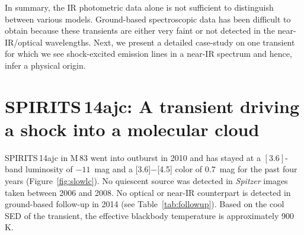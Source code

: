 \documentclass[twocolumn,times]{aastex6}
\begin{document}
%

In summary, the IR photometric data alone is not sufficient to  distinguish between 
various models. Ground-based spectroscopic data has been difficult to obtain because these transients
are either very faint or not detected in the near-IR/optical wavelengths. 
Next, we present a detailed case-study on one transient for which we see shock-excited emission lines 
in a near-IR spectrum and hence, infer a physical origin. 

\section{SPIRITS\,14ajc: A transient driving a shock into a molecular cloud}
\label{sec:14ajc}

SPIRITS\,14ajc  in M\,83 went into outburst in 2010 and has 
stayed at a $[3.6]$-band luminosity of  $-11$~mag and a [3.6]$-$[4.5] 
color of 0.7~mag for the past four years (Figure~\ref{fig:slowlc}). 
No quiescent source was detected in {\it Spitzer} images taken between 
2006 and 2008.    No optical or near-IR counterpart is detected 
in ground-based follow-up in 2014 (see Table~\ref{tab:followup}).  
Based on the cool SED of the transient, the effective 
blackbody temperature is approximately 900\,K. 
\end{document}
